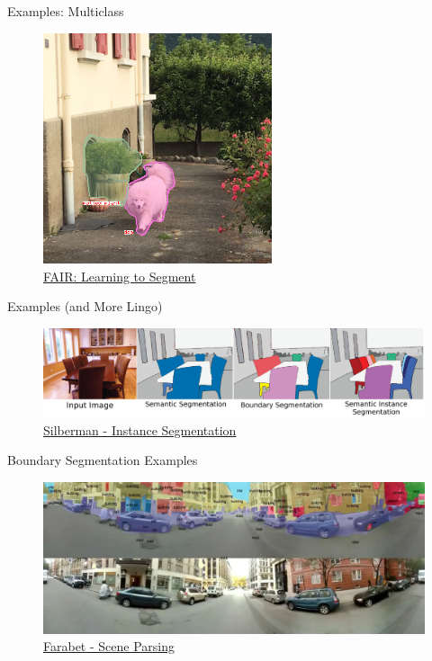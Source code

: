 \documentclass[handout]{beamer}
\begin{document}
\begin{frame}{Examples: Multiclass}
\begin{figure}
\includegraphics[width=0.6\textwidth,keepaspectratio]{../media/multipath_network_2.png}
\caption{\href{https://research.fb.com/learning-to-segment/}{\color{blue}FAIR: Learning to Segment}}
\end{figure}
\end{frame}

\begin{frame}{Examples (and More Lingo)}
\begin{figure}
\includegraphics[width=\textwidth]{../media/instance_segmentation_nyu.png}
\caption{\href{http://cs.nyu.edu/~silberman/projects/instance_segmentation.html}{\color{blue} Silberman - Instance Segmentation}}
\end{figure}
\end{frame}

\begin{frame}{Boundary Segmentation Examples}
\begin{figure}
\includegraphics[width=\textwidth]{../media/park-nyu-1-parsed.png}
\caption{\href{http://www.clement.farabet.net/research.html\#parsing}{\color{blue} Farabet - Scene Parsing}}
\end{figure}
\end{frame}
\end{document}
